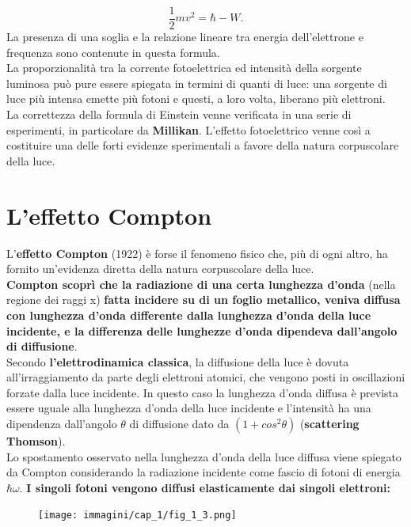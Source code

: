 \documentclass[a4paper,12pt,oneside]{book}
\begin{document}
	\begin{equation}
		\boxed{
			\frac{1}{2}m v^2= \hbar - W.
			}
	\end{equation}
La presenza di una soglia e la relazione lineare tra energia dell'elettrone e frequenza sono contenute in questa formula.\\
La proporzionalità tra la corrente fotoelettrica ed intensità della sorgente luminosa può pure essere spiegata in termini di quanti di luce: una sorgente di luce più intensa emette più fotoni e questi, a loro volta, liberano più elettroni.\\
La correttezza della formula di Einstein venne verificata in una serie di esperimenti, in particolare da \textbf{Millikan}. L'effetto fotoelettrico venne così a costituire una delle forti evidenze sperimentali a favore della natura corpuscolare della luce.
\section{L'effetto Compton}
L'\textbf{effetto Compton} (1922) è forse il fenomeno fisico che, più di ogni altro, ha fornito un'evidenza diretta della natura corpuscolare della luce.\\
\textbf{Compton scoprì che la radiazione di una certa lunghezza d'onda} (nella regione dei raggi x) \textbf{fatta incidere su di un foglio metallico, veniva diffusa con lunghezza d'onda differente dalla lunghezza d'onda della luce incidente, e la differenza delle lunghezze d'onda dipendeva dall'angolo di diffusione}.\\
Secondo \textbf{l'elettrodinamica classica}, la diffusione della luce è dovuta all'irraggiamento da parte degli elettroni atomici, che vengono posti in oscillazioni forzate dalla luce incidente. In questo caso la lunghezza d'onda diffusa è prevista essere uguale alla lunghezza d'onda della luce incidente e l'intensità ha una dipendenza dall'angolo $\theta$ di diffusione dato da $(1+cos^2 \theta)$ (\textbf{scattering Thomson}).\\
Lo spostamento osservato nella lunghezza d'onda della luce diffusa viene spiegato da Compton considerando la radiazione incidente come fascio di fotoni di energia $\hbar \omega$. \textbf{I singoli fotoni vengono diffusi elasticamente dai singoli elettroni:}
\newpage
	\begin{figure}[!htbp]
		\begin{center}
			\texttt{[image: immagini/cap\_1/fig\_1\_3.png]}
		\end{center}
	\end{figure}
\end{document}
